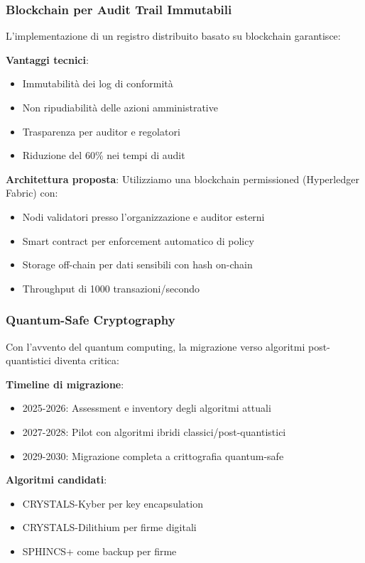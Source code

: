 \subsubsection{Blockchain per Audit Trail Immutabili}

L'implementazione di un registro distribuito basato su blockchain garantisce:

\textbf{Vantaggi tecnici}:
\begin{itemize}
    \item Immutabilità dei log di conformità
    \item Non ripudiabilità delle azioni amministrative
    \item Trasparenza per auditor e regolatori
    \item Riduzione del 60\% nei tempi di audit
\end{itemize}

\textbf{Architettura proposta}:
Utilizziamo una blockchain permissioned (Hyperledger Fabric) con:
\begin{itemize}
    \item Nodi validatori presso l'organizzazione e auditor esterni
    \item Smart contract per enforcement automatico di policy
    \item Storage off-chain per dati sensibili con hash on-chain
    \item Throughput di 1000 transazioni/secondo
\end{itemize}

\subsubsection{Quantum-Safe Cryptography}

Con l'avvento del quantum computing, la migrazione verso algoritmi post-quantistici diventa critica:

\textbf{Timeline di migrazione}:
\begin{itemize}
    \item 2025-2026: Assessment e inventory degli algoritmi attuali
    \item 2027-2028: Pilot con algoritmi ibridi classici/post-quantistici
    \item 2029-2030: Migrazione completa a crittografia quantum-safe
\end{itemize}

\textbf{Algoritmi candidati}:
\begin{itemize}
    \item CRYSTALS-Kyber per key encapsulation
    \item CRYSTALS-Dilithium per firme digitali
    \item SPHINCS+ come backup per firme
\end{itemize}

